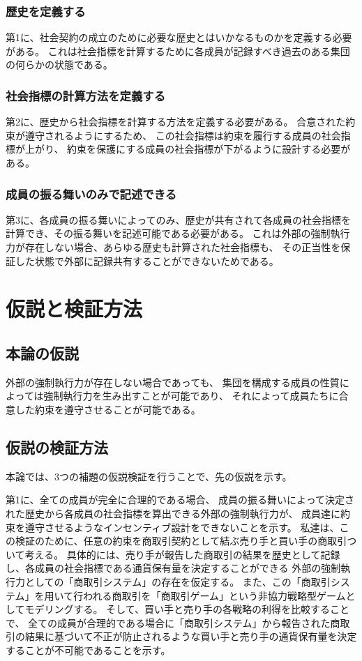 \documentclass[a4j]{ujreport}
\begin{document}
\subsection{歴史を定義する}
第1に、社会契約の成立のために必要な歴史とはいかなるものかを定義する必要がある。
これは社会指標を計算するために各成員が記録すべき過去のある集団の何らかの状態である。


\subsection{社会指標の計算方法を定義する}
第2に、歴史から社会指標を計算する方法を定義する必要がある。
合意された約束が遵守されるようにするため、
この社会指標は約束を履行する成員の社会指標が上がり、
約束を保護にする成員の社会指標が下がるように設計する必要がある。


\subsection{成員の振る舞いのみで記述できる}
第3に、各成員の振る舞いによってのみ、歴史が共有されて各成員の社会指標を計算でき、その振る舞いを記述可能である必要がある。
これは外部の強制執行力が存在しない場合、あらゆる歴史も計算された社会指標も、
その正当性を保証した状態で外部に記録共有することができないためである。


\chapter{仮説と検証方法}
\section{本論の仮説}
外部の強制執行力が存在しない場合であっても、
集団を構成する成員の性質によっては強制執行力を生み出すことが可能であり、
それによって成員たちに合意した約束を遵守させることが可能である。


\section{仮説の検証方法}
本論では、3つの補題の仮説検証を行うことで、先の仮説を示す。

第1に、全ての成員が完全に合理的である場合、
成員の振る舞いによって決定された歴史から各成員の社会指標を算出できる外部の強制執行力が、
成員達に約束を遵守させるようなインセンティブ設計をできないことを示す。
私達は、この検証のために、任意の約束を商取引契約として結ぶ売り手と買い手の商取引ついて考える。
具体的には、売り手が報告した商取引の結果を歴史として記録し、各成員の社会指標である通貨保有量を決定することができる
外部の強制執行力としての「商取引システム」の存在を仮定する。
また、この「商取引システム」を用いて行われる商取引を「商取引ゲーム」という非協力戦略型ゲームとしてモデリングする。
そして、買い手と売り手の各戦略の利得を比較することで、
全ての成員が合理的である場合に「商取引システム」から報告された商取引の結果に基づいて不正が防止されるような買い手と売り手の通貨保有量を決定することが不可能であることを示す。
\end{document}
